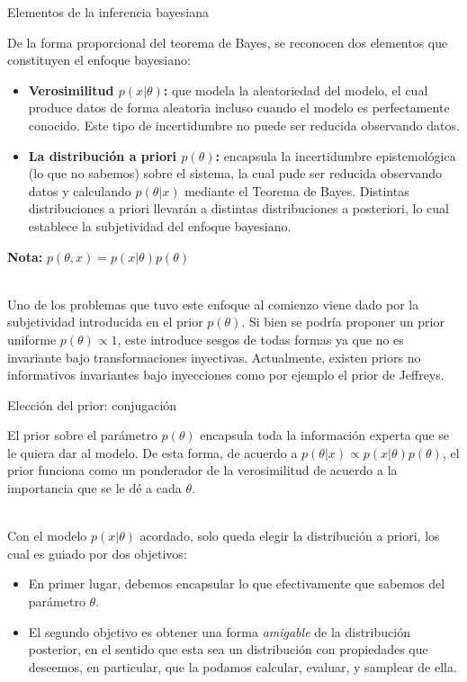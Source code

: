 \documentclass[9pt, handout]{beamer}
\begin{document}
\begin{frame}{Elementos de la inferencia bayesiana}

De la forma proporcional del teorema de Bayes, se reconocen dos elementos que constituyen el enfoque bayesiano:

\begin{itemize}
	\setlength\itemsep{1em}
	\item \textbf{Verosimilitud $p(x|\theta)$:} que modela la aleatoriedad del modelo, el cual produce datos de forma aleatoria incluso cuando el modelo es perfectamente conocido. Este tipo de incertidumbre no puede ser reducida observando datos.\pause
	\item \textbf{La distribución a priori $p(\theta)$:}  encapsula la incertidumbre epistemológica (lo que no sabemos) sobre el sistema, la cual pude ser reducida observando datos y calculando $p(\theta|x)$ mediante el Teorema de Bayes. Distintas distribuciones a priori llevarán a distintas distribuciones a posteriori, lo cual establece la subjetividad del enfoque bayesiano.\pause
\end{itemize}
\vspace{1em}
\textbf{Nota:} $p(\theta, x) = p(x|\theta)p(\theta)$\\~\

Uno de los problemas que tuvo este enfoque al comienzo viene dado por la subjetividad introducida en el prior $p(\theta)$. Si bien se podría proponer un prior uniforme $p(\theta)\propto 1$, este introduce sesgos de todas formas ya que no es invariante bajo transformaciones inyectivas. Actualmente, existen priors no informativos invariantes bajo inyecciones como por ejemplo el prior de Jeffreys.
	
\end{frame}

\begin{frame}{Elección del prior: conjugación}

El prior sobre el parámetro $p(\theta)$ encapsula toda la información experta que se le quiera dar al modelo. De esta forma, de acuerdo a $p(\theta|x) \propto p(x|\theta)p(\theta)$, el prior funciona como un ponderador de la verosimilitud de acuerdo a la importancia que se le dé a cada $\theta$. \\~\ \pause

Con el modelo $p(x|\theta)$ acordado, solo  queda elegir la distribución a priori, los cual es guiado por dos objetivos:\pause

\begin{itemize}
	\item  En primer lugar, debemos encapsular lo que efectivamente que sabemos del parámetro $\theta$.\pause
	\item  El segundo objetivo es obtener una forma \emph{amigable} de la distribución posterior, en el sentido que esta sea un distribución con propiedades que deseemos, en particular, que la podamos calcular, evaluar, y samplear de ella.
	
\end{itemize}

\end{frame}
\end{document}
